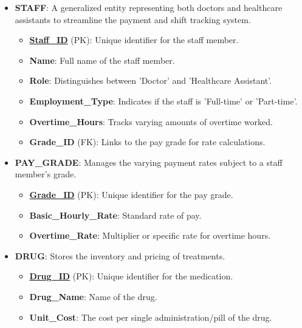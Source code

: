 \documentclass[12pt,a3paper]{article}
\begin{document}
\begin{enumerate}
\begin{tcolorbox}[enhanced,breakable,ansbox,colback=cA!4,colframe=cA,boxrule=0.8pt,arc=5pt,title={\textbf{Answer}},fonttitle=\bfseries\color{white},colbacktitle=cA]
\begin{itemize}[leftmargin=2em, itemsep=1em]
    \item \textbf{STAFF}: A generalized entity representing both doctors and healthcare assistants to streamline the payment and shift tracking system.
    \begin{itemize}[label={--}, itemsep=2pt]
        \item \underline{\textbf{Staff\_ID}} (PK): Unique identifier for the staff member.
        \item \textbf{Name}: Full name of the staff member.
        \item \textbf{Role}: Distinguishes between 'Doctor' and 'Healthcare Assistant'.
        \item \textbf{Employment\_Type}: Indicates if the staff is 'Full-time' or 'Part-time'.
        \item \textbf{Overtime\_Hours}: Tracks varying amounts of overtime worked.
        \item \textbf{Grade\_ID} (FK): Links to the pay grade for rate calculations.
    \end{itemize}

    \item \textbf{PAY\_GRADE}: Manages the varying payment rates subject to a staff member's grade.
    \begin{itemize}[label={--}, itemsep=2pt]
        \item \underline{\textbf{Grade\_ID}} (PK): Unique identifier for the pay grade.
        \item \textbf{Basic\_Hourly\_Rate}: Standard rate of pay.
        \item \textbf{Overtime\_Rate}: Multiplier or specific rate for overtime hours.
    \end{itemize}

    \item \textbf{DRUG}: Stores the inventory and pricing of treatments.
    \begin{itemize}[label={--}, itemsep=2pt]
        \item \underline{\textbf{Drug\_ID}} (PK): Unique identifier for the medication.
        \item \textbf{Drug\_Name}: Name of the drug.
        \item \textbf{Unit\_Cost}: The cost per single administration/pill of the drug.
    \end{itemize}


\end{itemize}
\end{tcolorbox}
\end{enumerate}
\end{document}
